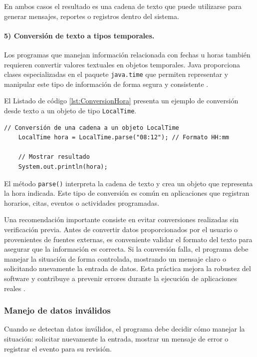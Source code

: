 \documentclass[12pt,twoside]{book}
\begin{document}
						\noindent
						En ambos casos el resultado es una cadena de texto que puede utilizarse para generar mensajes, reportes o registros dentro del sistema.
						
						\paragraph{5) Conversión de texto a tipos temporales.}
						
						\noindent
						Los programas que manejan información relacionada con fechas u horas también requieren convertir valores textuales en objetos temporales. Java proporciona clases especializadas en el paquete \texttt{java.time} que permiten representar y manipular este tipo de información de forma segura y consistente \cite{Bloch2018EffectiveJava}.
						
						El Listado de código \ref{lst:ConversionHora} presenta un ejemplo de conversión desde texto a un objeto de tipo \texttt{LocalTime}.
						
						\begin{lstlisting}[style=Java,caption={Conversión de texto a hora mediante LocalTime.},label={lst:ConversionHora}]
	// Conversión de una cadena a un objeto LocalTime
	LocalTime hora = LocalTime.parse("08:12"); // Formato HH:mm
	
	// Mostrar resultado
	System.out.println(hora);
						\end{lstlisting}
						
						\noindent
						El método \texttt{parse()} interpreta la cadena de texto y crea un objeto que representa la hora indicada. Este tipo de conversión es común en aplicaciones que registran horarios, citas, eventos o actividades programadas.
						
						Una recomendación importante consiste en evitar conversiones realizadas sin verificación previa. Antes de convertir datos proporcionados por el usuario o provenientes de fuentes externas, es conveniente validar el formato del texto para asegurar que la información es correcta. Si la conversión falla, el programa debe manejar la situación de forma controlada, mostrando un mensaje claro o solicitando nuevamente la entrada de datos. Esta práctica mejora la robustez del software y contribuye a prevenir errores durante la ejecución de aplicaciones reales \cite{Sommerville2015Software,Deitel2025Java}.						
					\subsubsection{Manejo de datos inválidos}
						\noindent
						Cuando se detectan datos inválidos, el programa debe decidir cómo manejar la situación: solicitar nuevamente la entrada, mostrar un mensaje de error o registrar el evento para su revisión.
						
\end{document}
